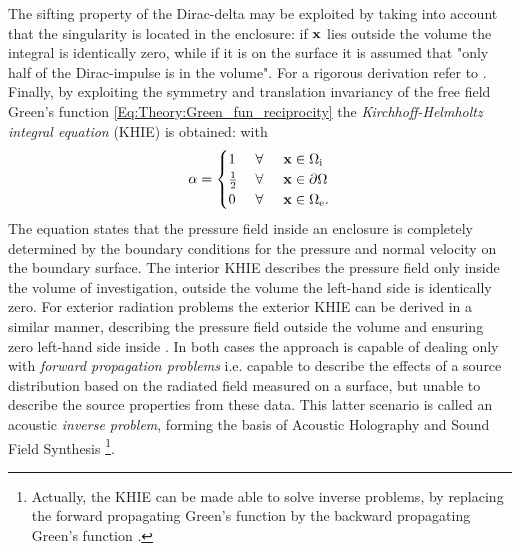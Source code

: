 The sifting property of the Dirac-delta may be exploited by taking into account that the singularity is located in the enclosure:
if $\mathbf{x}$ lies outside the volume the integral is identically zero, while if it is on the surface it is assumed that "only half of the Dirac-impulse is in the volume".
For a rigorous derivation refer to \cite{Williams1999}.
Finally, by exploiting the symmetry and translation invariancy of the free field Green's function \eqref{Eq:Theory:Green_fun_reciprocity} the \emph{Kirchhoff-Helmholtz integral equation} (KHIE) is obtained:
%
%
with
\begin{equation*}
\alpha = \begin{cases} 
1           & \hspace{1mm} \forall \hspace{5mm}  \mathbf{x} \in \Omega_{\mathrm{i}}  	   \\
\frac{1}{2} & \hspace{1mm} \forall \hspace{5mm}  \mathbf{x} \in \partial \Omega  \\
0 			& \hspace{1mm} \forall \hspace{5mm}  \mathbf{x} \in \Omega_{\mathrm{e}}.
\end{cases}
\end{equation*}
The equation states that the pressure field inside an enclosure is completely determined by the boundary conditions for the pressure and normal velocity on the boundary surface.
The interior KHIE describes the pressure field only inside the volume of investigation, outside the volume the left-hand side is identically zero. 
For exterior radiation problems the exterior KHIE can be derived in a similar manner, describing the pressure field outside the volume and ensuring zero left-hand side inside \cite{Williams1999}.
In both cases the approach is capable of dealing only with \emph{forward propagation problems} i.e. capable to describe the effects of a source distribution based on the radiated field measured on a surface, but unable to describe the source properties from these data. 
This latter scenario is called an acoustic \emph{inverse problem}, forming the basis of Acoustic Holography and Sound Field Synthesis 
\footnote{Actually, the KHIE can be made able to solve inverse problems, by replacing the forward propagating Green's function by the backward propagating Green's function \cite{Wapenaar1989}.}.
\vspace{3mm}

